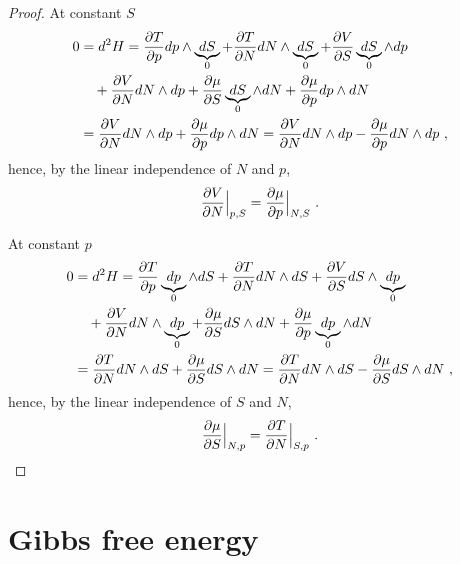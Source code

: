 \begin{proof}
        At constant $S$ 
        \begin{equation*}
        \begin{aligned}
            0 & = d^2 H = \frac{\partial T}{\partial p} dp \wedge \underbrace{dS}_0 + \frac{\partial T}{\partial N} dN \wedge \underbrace{dS}_0 + \frac{\partial V}{\partial S} \underbrace{dS}_0 \wedge dp \\ & \quad + \frac{\partial V}{\partial N} dN \wedge dp + \frac{\partial\mu}{\partial S} \underbrace{dS}_0 \wedge dN + \frac{\partial\mu}{\partial p} dp \wedge dN \\ & = \frac{\partial V}{\partial N} dN \wedge dp + \frac{\partial\mu}{\partial p} dp \wedge dN = \frac{\partial V}{\partial N} dN \wedge dp - \frac{\partial\mu}{\partial p} dN \wedge dp ~,
        \end{aligned}
        \end{equation*}
        hence, by the linear independence of $N$ and $p$,
        \begin{equation*}
            \frac{\partial V}{\partial N} \Big \vert_{p,S} = \frac{\partial\mu}{\partial p} \Big \vert_{N, S} ~.
        \end{equation*}

        At constant $p$ 
        \begin{equation*}
        \begin{aligned}
            0 & = d^2 H = \frac{\partial T}{\partial p} \underbrace{dp}_0 \wedge dS + \frac{\partial T}{\partial N} dN \wedge dS + \frac{\partial V}{\partial S} dS \wedge \underbrace{dp}_0 \\ & \quad + \frac{\partial V}{\partial N} dN \wedge \underbrace{dp}_0 + \frac{\partial\mu}{\partial S} dS \wedge dN + \frac{\partial\mu}{\partial p} \underbrace{dp}_0 \wedge dN \\ & = \frac{\partial T}{\partial N} dN \wedge dS + \frac{\partial\mu}{\partial S} dS \wedge dN = \frac{\partial T}{\partial N} dN \wedge dS - \frac{\partial\mu}{\partial S} dS \wedge dN ~,
        \end{aligned}
        \end{equation*}
        hence, by the linear independence of $S$ and $N$,
        \begin{equation*}
            \frac{\partial\mu}{\partial S} \Big \vert_{N,p} = \frac{\partial T}{\partial N} \Big \vert_{S, p} ~.
        \end{equation*}
    \end{proof}

\section{Gibbs free energy} 

